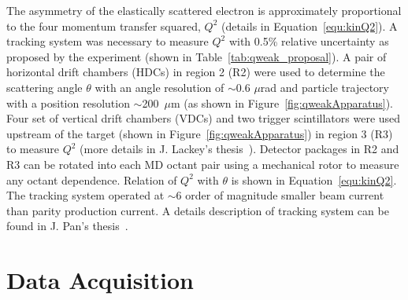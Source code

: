 The asymmetry of the elastically scattered electron is approximately proportional to the four momentum transfer squared, $Q^{2}$ (details in Equation~\ref{equ:kinQ2}). A tracking system was necessary to measure $Q^{2}$ with 0.5\% relative uncertainty as proposed by the experiment (shown in Table~\ref{tab:qweak_proposal}). A pair of horizontal drift chambers (HDCs) in region 2 (R2) were used to determine the scattering angle $\theta$ with an angle resolution of $\sim$0.6 $\mu$rad and particle trajectory with a position resolution $\sim$200~$\mu$m (as shown in Figure~\ref{fig:qweakApparatus}). Four set of vertical drift chambers (VDCs) and two trigger scintillators were used upstream of the target (shown in Figure~\ref{fig:qweakApparatus}) in region 3 (R3) to measure $Q^{2}$ (more details in J. Lackey's thesis~\cite{lackey_qweak}). Detector packages in R2 and R3 can be rotated into each MD octant pair using a mechanical rotor to measure any octant dependence. Relation of $Q^{2}$ with $\theta$ is shown in Equation~\ref{equ:kinQ2}. The tracking system operated at $\sim$6 order of magnitude smaller beam current than parity production current. A details description of tracking system can be found in J. Pan's thesis~\cite{jie_qweak_thesis}.


\section{Data Acquisition}%
\label{Data Acquisition}

